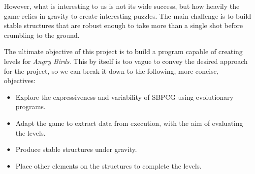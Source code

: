However, what is interesting to us is not its wide success, but how heavily the game relies in gravity to create interesting puzzles. The main challenge is to build stable structures that are robust enough to take more than a single shot before crumbling to the ground.

 

The ultimate objective of this project is to build a program capable of creating levels for \textit{Angry Birds}. This by itself is too vague to convey the desired approach for the project, so we can break it down to the following, more concise, objectives:

\begin{itemize}
	\item Explore the expressiveness and variability of SBPCG using evolutionary programs. 
	\item Adapt the game to extract data from execution, with the aim of evaluating the levels.
	\item Produce stable structures under gravity.
	\item Place other elements on the structures to complete the levels.
\end{itemize} 


